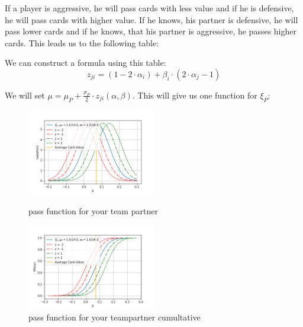 If a player is aggressive, he will pass cards with less value and if he is defensive, he will pass cards with higher value. If he knows, his partner is defensive, he will pass lower cards and if he knows, that his partner is aggressive, he passes higher cards. This leads us to the following table:  \\
\begin{table}[h]
\caption{Table 2} \bigskip
\label{tab:my-table}
\end{table}
We can construct a formula using this table: 
\begin{equation*}
z_{ji} = (1 - 2\cdot\alpha_i) + \beta_i \cdot (2\cdot\alpha_j - 1)
\end{equation*}

We will set $\mu = \mu_P + \frac{\sigma_P}{2} \cdot z_{ji}(\alpha, \beta)$. This will give us one function for $\xi_P$:

\begin{figure}[h]
    \centering
    \includegraphics[width=0.5\textwidth]{Bilder/pass_function_p}
    \caption{pass function for your team partner}
    \label{fig:meine-grafik}
    \centering
    \includegraphics[width=0.5\textwidth]{Bilder/pass_function_p_cumultative}
    \caption{pass function for your teampartner cumultative}
    \label{fig:meine-grafik}
\end{figure}

